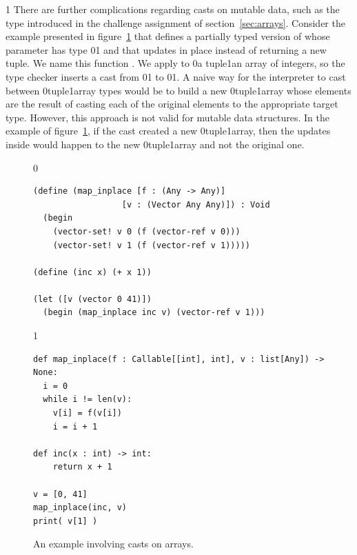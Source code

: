 \documentclass[7x10]{TimesAPriori_MIT}%
\def\racketEd{0}
\def\pythonEd{1}
\def\edition{1}
\newcommand{\racket}[1]{{\if\edition\racketEd{#1}\fi}}
\newcommand{\pythonColor}[0]{}
\newcommand{\python}[1]{{\if\edition\pythonEd\pythonColor #1\fi}}
\numberwithin{theorem}{chapter}
\numberwithin{definition}{chapter}
\numberwithin{equation}{chapter}
\begin{document}
{\if\edition\pythonEd\pythonColor
%
There are further complications regarding casts on mutable data,
such as the  type introduced in
the challenge assignment of section~\ref{sec:arrays}.
%
\fi}
%
Consider the example presented in figure~\ref{fig:map-bang} that
defines a partially typed version of  whose parameter
 has type
\racket{}\python{}
and that updates  in place
instead of returning a new tuple. We name this function
. We apply  to
\racket{a tuple}\python{an array} of integers, so the type checker
inserts a cast from
\racket{}\python{}
to
\racket{}\python{}.
A naive way for the \LangCast{} interpreter to cast between
\racket{tuple}\python{array} types would be to build a new
\racket{tuple}\python{array} whose elements are the result
of casting each of the original elements to the appropriate target
type. However, this approach is not valid for mutable data structures.
In the example of figure~\ref{fig:map-bang},
if the cast created a new \racket{tuple}\python{array}, then the updates inside
 would happen to the new \racket{tuple}\python{array} and not
the original one.

\begin{figure}[tbp]
  \begin{tcolorbox}[colback=white]
{\if\edition\racketEd
\begin{lstlisting}
(define (map_inplace [f : (Any -> Any)]
                  [v : (Vector Any Any)]) : Void
  (begin
    (vector-set! v 0 (f (vector-ref v 0)))
    (vector-set! v 1 (f (vector-ref v 1)))))

(define (inc x) (+ x 1))

(let ([v (vector 0 41)])
  (begin (map_inplace inc v) (vector-ref v 1)))
\end{lstlisting}
\fi}
{\if\edition\pythonEd\pythonColor
\begin{lstlisting}
def map_inplace(f : Callable[[int], int], v : list[Any]) -> None:
  i = 0
  while i != len(v):
    v[i] = f(v[i])
    i = i + 1

def inc(x : int) -> int:
    return x + 1

v = [0, 41]
map_inplace(inc, v)
print( v[1] )
\end{lstlisting}
\fi}
  \end{tcolorbox}

  \caption{An example involving casts on arrays.}
\label{fig:map-bang}
\end{figure}
\end{document}
